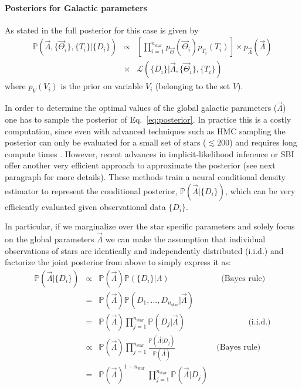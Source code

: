 \documentclass{aa}
\begin{document}
\paragraph{Posteriors for Galactic parameters}
As stated in \citet{Philcox_2019} the full posterior for this case is given by 
\begin{eqnarray}\label{eq:posterior}
    \mathbb{P}(\vec\Lambda,\{\vec\Theta_i\},\{T_i\}|\{D_i\}) &\propto&  \left[\prod_{i=1}^{n_\mathrm{star}}p_{\vec\Theta}(\vec\Theta_i)p_{T_i}(T_i)\right]
    \times p_{\vec\Lambda}(\vec\Lambda)\\
    \nonumber
    &\times& \mathcal{L}(\{D_i\}|\vec\Lambda,\{\vec\Theta_i\},\{T_i\})
\end{eqnarray}
where $p_V(V_i)$ is the prior on variable $V_i$ (belonging to the set $V$).

In order to determine the optimal values of the global galactic parameters ($\Vec{\Lambda}$) one has to sample the posterior of Eq.~\ref{eq:posterior}. In practice this is a costly computation, since even with advanced techniques such as HMC sampling the posterior can only be evaluated for a small set of stars ($\lesssim200$) and requires long compute times \citep[$\sim40$ hours][]{Philcox_2019}.
%
However, recent advances in implicit-likelihood inference or SBI \citep{Cranmer2020} offer another very efficient approach to approximate the posterior (see next paragraph for more details). These methods train a neural conditional density estimator to represent the conditional posterior, $\mathbb{P}(\vec\Lambda|\{D_i\})$, which can be very efficiently evaluated given observational data $\{D_i\}$.

In particular, if we marginalize over the star specific parameters and solely focus on the global parameters $\Vec{\Lambda}$ we can make the assumption that individual observations of stars are identically and independently distributed (i.i.d.) and factorize the joint posterior from above to simply express it as:  %
\begin{eqnarray}
\mathbb{P}(\vec\Lambda|\{D_i\}) &\propto& 
\mathbb{P}(\vec\Lambda)\mathbb{P}(\{D_i\}|\Lambda)\quad\quad\quad\quad\quad\quad\,\, \text{(Bayes rule)}
\\\nonumber
&=&
\mathbb{P}(\vec\Lambda)\mathbb{P}
(D_1,...,D_{n_\mathrm{star}}|\vec\Lambda)
\\\nonumber
&=& \mathbb{P}(\vec\Lambda)\prod_{j=1}^{n_\mathrm{star}}\mathbb{P}(D_j|\vec\Lambda) \quad\quad\quad\quad\quad\quad\quad\,\,\,\, \text{(i.i.d.)}
\\\nonumber
&\propto& \mathbb{P}(\vec\Lambda) \prod_{j=1}^{n_\mathrm{star}}\frac{\mathbb{P}(\vec\Lambda|D_j)}{\mathbb{P}(\vec\Lambda)} \quad\quad\quad\quad\quad\text{(Bayes rule)}
\\%
\label{eq:posterior}
&=& \mathbb{P}(\vec\Lambda)^{1-n_\mathrm{star}}\ \prod_{j=1}^{n_\mathrm{star}}\mathbb{P}(\vec\Lambda|D_j) 
\end{eqnarray}
\end{document}
